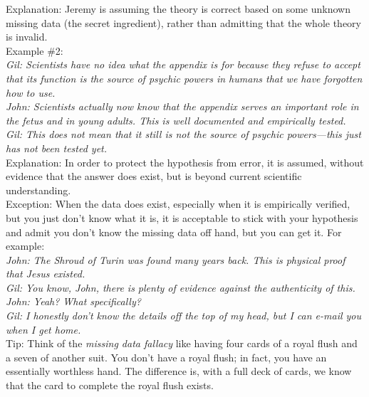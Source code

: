 \documentclass[a4paper,12pt,single,pdftex]{scrbook}
\begin{document}
    
      Explanation: Jeremy is assuming the theory is correct based on some unknown missing data (the secret ingredient), rather than admitting that the whole theory is invalid.
    \\

    
      Example \#2: 
    \\

    
      {\em Gil: Scientists have no idea what the appendix is for because they refuse to accept that its function is the source of psychic powers in humans that we have forgotten how to use.}
    \\

    
      {\em John: Scientists actually now know that the appendix serves an important role in the fetus and in young adults.  This is well documented and empirically tested.}
    \\

    
      {\em Gil: This does not mean that it still is not the source of psychic powers—this just has not been tested yet.}
    \\

    
      Explanation: In order to protect the hypothesis from error, it is assumed, without evidence that the answer does exist, but is beyond current scientific understanding. 
    \\

    
      Exception: When the data does exist, especially when it is empirically verified, but you just don't know what it is, it is acceptable to stick with your hypothesis and admit you don’t know the missing data off hand, but you can get it.  For example:
    \\

    
      {\em John: The Shroud of Turin was found many years back.  This is physical proof that Jesus existed.}
    \\

    
      {\em Gil: You know, John, there is plenty of evidence against the authenticity of this.}
    \\

    
      {\em John: Yeah? What specifically?}
    \\

    
      {\em Gil: I honestly don’t know the details off the top of my head, but I can e-mail you when I get home.}
    \\

    
      Tip: Think of the {\em missing data fallacy} like having four cards of a royal flush and a seven of another suit. You don’t have a royal flush; in fact, you have an essentially worthless hand. The difference is, with a full deck of cards, we know that the card to complete the royal flush exists.
    \\
\end{document}
